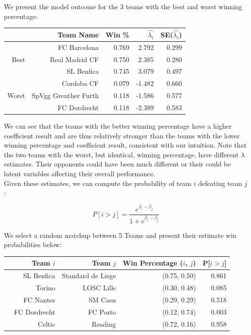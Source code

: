 \documentclass{article}
\begin{document}
We present the model outcome for the 3 teams with the best and worst winning percentage:

\begin{table}[H]
\centering
\begin{tabular}{|r|rrrr|}
  \hline
 & Team Name & Win \% & $\hat{\lambda_i}$ & SE($\hat{\lambda_i}$) \\ 
  \hline
   &  FC Barcelona & 0.769 & 2.792 & 0.299 \\ 
 Best  &  Real Madrid CF & 0.750 & 2.385 & 0.280 \\ 
   &  SL Benfica & 0.745 & 3.079 & 0.497 \\ \cline{1-5}
   &  Cordoba CF & 0.079 & -1.482 & 0.660 \\ 
Worst   &  SpVgg Greuther Furth & 0.118 & -1.586  & 0.577 \\ 
   & FC Dordrecht & 0.118 & -2.389 & 0.583 \\
   \hline
\end{tabular}
\end{table}

We can see that the teams with the better winning percentage have a higher coefficient result and are thus relatively stronger than the teams with the lower winning percentage and coefficient result, consistent with our intuition. Note that the two teams with the worst, but identical, winning percentage, have different $\lambda$ estimates. Their opponents could have been much different or their could be latent variables affecting their overall performance. \\

Given these estimates, we can compute the probability of team $i$ defeating team $j$:

$$P[i > j] = \frac{e^{\beta_i - \beta_j}}{1 + e^{\beta_i - \beta_j}}$$

We select a random matchup between 5 Teams and present their estimate win probabilities below:

\begin{table}[H]
\centering
\begin{tabular}{rrrrr}
  \hline
 & Team $i$ & Team $j$ & Win Percentage ($i$, $j$) & P[$i > j$] \\ 
  \hline
 & SL Benfica  & Standard de Liege & (0.75, 0.50) & 0.861 \\ 
   & Torino & LOSC Lille & (0.30, 0.48) & 0.085 \\ 
   & FC Nantes & SM Caen & (0.29, 0.29)  & 0.518 \\ 
   & FC Dordrecht & FC Porto & (0.12, 0.74) & 0.003 \\ 
   & Celtic & Reading & (0.72, 0.16) & 0.958 \\ 
   \hline
\end{tabular}
\end{table}
\end{document}
